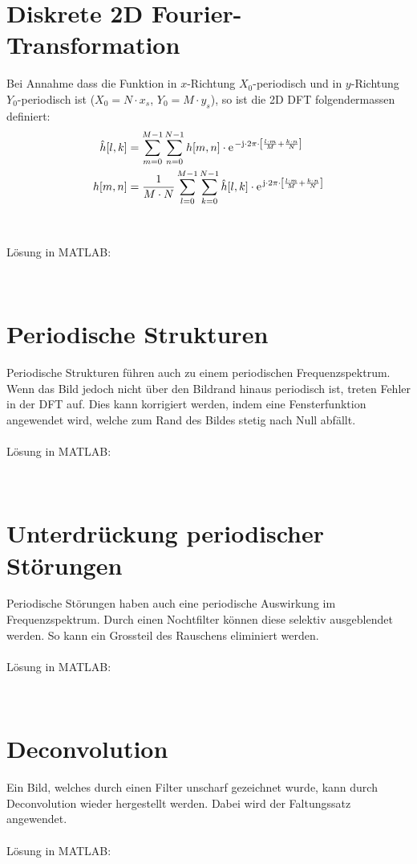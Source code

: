 \section{Diskrete 2D Fourier-Transformation}
Bei Annahme dass die Funktion in $x$-Richtung $X_0$-periodisch und in $y$-Richtung $Y_0$-periodisch ist ($X_0 = N \cdot x_s$, $Y_0 = M \cdot y_s$), so ist die 2D DFT folgendermassen definiert:
\[\begin{aligned}
	\hat{h}[l,k] &= \sum_{m=0}^{M-1} \sum_{n=0}^{N-1} h[m,n] \cdot \mathrm{e\;\!}^{-\mathrm{j} \cdot 2\pi \cdot \left[\frac{l \cdot m}{M} + \frac{k \cdot n}{N}\right]}
	\\
	h[m,n] &= \frac{1}{M \cdot N} \sum_{l=0}^{M-1} \sum_{k=0}^{N-1} \hat{h}[l,k] \cdot \mathrm{e\;\!}^{\mathrm{j} \cdot 2\pi \cdot \left[\frac{l \cdot m}{M} + \frac{k \cdot n}{N}\right]}
\end{aligned}\]
~\\\\
Lösung in MATLAB:
\lstset{language=Matlab}

~\\

\section{Periodische Strukturen}
Periodische Strukturen führen auch zu einem periodischen Frequenzspektrum.
Wenn das Bild jedoch nicht über den Bildrand hinaus periodisch ist, treten Fehler in der DFT auf.
Dies kann korrigiert werden, indem eine Fensterfunktion angewendet wird, welche zum Rand des Bildes stetig nach Null abfällt.
~\\\\
Lösung in MATLAB:
\lstset{language=Matlab}

~\\

\section{Unterdrückung periodischer Störungen}
Periodische Störungen haben auch eine periodische Auswirkung im Frequenzspektrum.
Durch einen Nochtfilter können diese selektiv ausgeblendet werden. So kann ein Grossteil des Rauschens eliminiert werden.
~\\\\
Lösung in MATLAB:
\lstset{language=Matlab}

~\\

\section{Deconvolution}
Ein Bild, welches durch einen Filter unscharf gezeichnet wurde, kann durch Deconvolution wieder hergestellt werden. Dabei wird der Faltungssatz angewendet.
~\\\\
Lösung in MATLAB:
\lstset{language=Matlab}

~\\